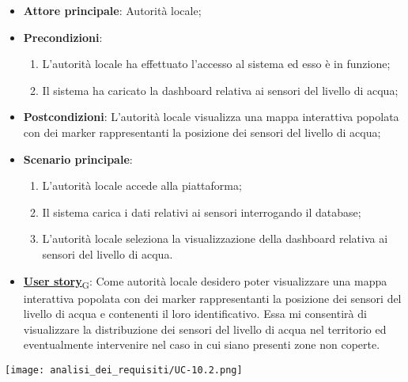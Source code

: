 \begin{itemize}
	\item \textbf{Attore principale}: Autorità locale;
	\item \textbf{Precondizioni}:
	      \begin{enumerate}
		      \item L'autorità locale ha effettuato l'accesso al sistema ed esso è in funzione;
		      \item Il sistema ha caricato la dashboard relativa ai sensori del livello di acqua;
	      \end{enumerate}
	\item \textbf{Postcondizioni}: L'autorità locale visualizza una mappa interattiva popolata con dei marker rappresentanti la posizione dei sensori del livello di acqua;
	\item \textbf{Scenario principale}:
	      \begin{enumerate}
		      \item L'autorità locale accede alla piattaforma;
		      \item Il sistema carica i dati relativi ai sensori interrogando il database;
		      \item L'autorità locale seleziona la visualizzazione della dashboard relativa ai sensori del livello di acqua.
	      \end{enumerate}
	\item \href{https://7last.github.io/docs/rtb/documentazione-interna/glossario\#user-story}{\textbf{User story}\textsubscript{G}}:
	      Come autorità locale desidero poter visualizzare una mappa interattiva popolata con dei marker rappresentanti la posizione dei sensori del livello di acqua
	      e contenenti il loro identificativo. Essa mi consentirà di visualizzare la distribuzione dei sensori del livello di acqua nel territorio ed eventualmente intervenire nel caso in cui siano presenti zone non coperte.
\end{itemize}
\begin{center}
	\texttt{[image: analisi\_dei\_requisiti/UC-10.2.png]}
\end{center}


